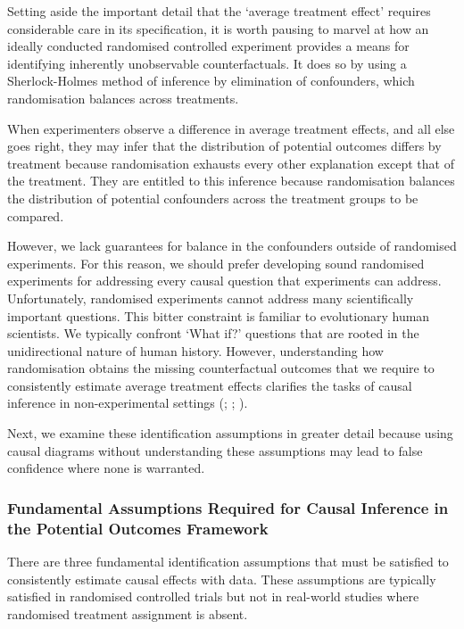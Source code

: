 \documentclass[
  single column]{article}
\begin{document}
Setting aside the important detail that the `average treatment effect'
requires considerable care in its specification, it is worth pausing to
marvel at how an ideally conducted randomised controlled experiment
provides a means for identifying inherently unobservable
counterfactuals. It does so by using a Sherlock-Holmes method of
inference by elimination of confounders, which randomisation balances
across treatments.

When experimenters observe a difference in average treatment effects,
and all else goes right, they may infer that the distribution of
potential outcomes differs by treatment because randomisation exhausts
every other explanation except that of the treatment. They are entitled
to this inference because randomisation balances the distribution of
potential confounders across the treatment groups to be compared.

However, we lack guarantees for balance in the confounders outside of
randomised experiments. For this reason, we should prefer developing
sound randomised experiments for addressing every causal question that
experiments can address. Unfortunately, randomised experiments cannot
address many scientifically important questions. This bitter constraint
is familiar to evolutionary human scientists. We typically confront
`What if?' questions that are rooted in the unidirectional nature of
human history. However, understanding how randomisation obtains the
missing counterfactual outcomes that we require to consistently estimate
average treatment effects clarifies the tasks of causal inference in
non-experimental settings (; ;
).

Next, we examine these identification assumptions in greater detail
because using causal diagrams without understanding these assumptions
may lead to false confidence where none is warranted.

\subsubsection{Fundamental Assumptions Required for Causal Inference in
the Potential Outcomes
Framework}\label{fundamental-assumptions-required-for-causal-inference-in-the-potential-outcomes-framework}

There are three fundamental identification assumptions that must be
satisfied to consistently estimate causal effects with data. These
assumptions are typically satisfied in randomised controlled trials but
not in real-world studies where randomised treatment assignment is
absent.
\end{document}
